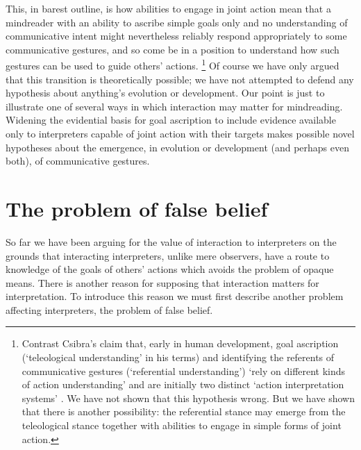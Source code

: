 \documentclass[14pt,a4paper]{extarticle}
\begin{document}
This, in barest outline, is 
how
abilities to engage in joint action
mean that 
a mindreader with an ability to ascribe simple goals only and no understanding of communicative intent
might 
nevertheless reliably respond appropriately to some communicative gestures,
and so come be in a position to understand how such gestures can be used to guide others' actions.%
\footnote{
Contrast Csibra's claim that,
early in human development,
goal ascription (`teleological understanding' in his terms)
and 
identifying the referents of communicative gestures (`referential understanding')
`rely on different kinds of action understanding' %
and
are initially two distinct `action interpretation systems'   \citep[p.\ 456]{Csibra:2003kp}.
We have not shown that this hypothesis wrong.
But we have shown that there is another possibility:
the referential stance may 
emerge from
the teleological stance
 together with abilities to engage in simple forms of joint action.
}
Of course we have only argued that this transition is theoretically possible;
we have not attempted to defend any hypothesis about 
anything's evolution or development.
Our point is just to illustrate one of several ways in which
interaction may matter for mindreading.
Widening the evidential basis for goal ascription
to include evidence available only to interpreters capable of joint action with their targets
makes possible 
novel hypotheses about the emergence, in evolution or development (and perhaps even both), of communicative gestures.



\section{The problem of false belief}
\label{sec:false_belief}
So far we have been arguing for the value of interaction to interpreters 
on the grounds that 
interacting interpreters, unlike mere observers, have 
a route to knowledge of the goals of others' actions
which avoids the problem of opaque means.
There is another reason for supposing that interaction matters for interpretation.
To introduce this reason we must first describe another problem affecting interpreters, the problem of false belief.
\end{document}
